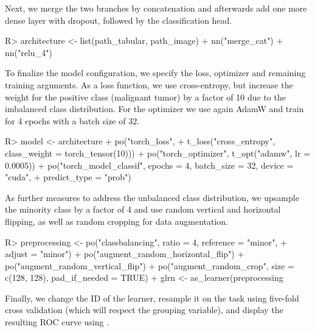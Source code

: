 \documentclass[article]{jss}
\theoremstyle{definition}
\begin{document}
Next, we merge the two branches by concatenation and afterwards add one more dense layer with dropout, followed by the classification head.

\begin{CodeInput}
R> architecture <- list(path_tabular, path_image) %
+    nn("merge_cat") %
+    nn("relu_4") %
\end{CodeInput}

To finalize the model configuration, we specify the loss, optimizer and remaining training arguments.
As a loss function, we use cross-entropy, but increase the weight for the positive class (malignant tumor) by a factor of 10 due to the imbalanced class distribution.
For the optimizer we use again AdamW and train for 4 epochs with a batch size of $32$.

\begin{CodeInput}
R> model <- architecture %
+    po("torch_loss",
+      t_loss("cross_entropy", class_weight = torch_tensor(10))) %
+    po("torch_optimizer", t_opt("adamw", lr = 0.0005)) %
+    po("torch_model_classif", epochs = 4, batch_size = 32, device = "cuda",
+      predict_type = "prob")
\end{CodeInput}

As further measures to address the unbalanced class distribution, we upsample the minority class by a factor of 4 and use random vertical and horizontal flipping, as well as random cropping for data augmentation.

\begin{CodeInput}
R> preprocessing <- po("classbalancing", ratio = 4, reference = "minor",
+      adjust = "minor") %
+    po("augment_random_horizontal_flip") %
+    po("augment_random_vertical_flip") %
+    po("augment_random_crop", size = c(128, 128), pad_if_needed = TRUE)
+  glrn <- as_learner(preprocessing %
\end{CodeInput}

Finally, we change the ID of the learner, resample it on the task using five-fold cross validation (which will respect the grouping variable), and display the resulting ROC curve using  \citep{ref-mlr3viz2025}.

\end{document}
